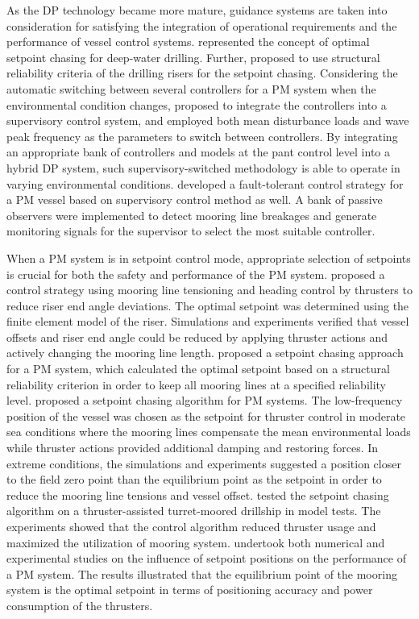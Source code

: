 \begin{sloppypar}
As the DP technology became more mature, guidance systems are taken into consideration for satisfying the integration of operational requirements and the performance of vessel control systems.  \cite{sorensen2001optimal} represented the concept of optimal setpoint chasing for deep-water drilling. Further,  \cite{leira2006structural} proposed to use structural reliability criteria of the drilling risers for the setpoint chasing. Considering the automatic switching between several controllers for a PM system when the environmental condition changes, \cite{nguyen2009switching} proposed to integrate the controllers into a supervisory control system, and employed both mean disturbance loads and wave peak frequency as the parameters to switch between controllers. By integrating an appropriate bank of controllers and models at the pant control level into a hybrid DP system, such supervisory-switched methodology is able to operate in varying environmental conditions. \cite{ren2015supervisory} developed a fault-tolerant control strategy for a PM vessel based on supervisory control method as well. A bank of passive observers were implemented to detect mooring line breakages and generate monitoring signals for the supervisor to select the most suitable controller.

When a PM system is in setpoint control mode, appropriate selection of setpoints is crucial for both the safety and performance of the PM system. \cite{nguyen2010control} proposed a control strategy using mooring line tensioning and heading control by thrusters to reduce riser end angle deviations. The optimal setpoint was determined using the finite element model of the riser. Simulations and experiments verified that vessel offsets and riser end angle could be reduced by applying thruster actions and actively changing the mooring line length. \cite{fang2013position} proposed a setpoint chasing approach for a PM system, which calculated the optimal setpoint based on a structural reliability criterion in order to keep all mooring lines at a specified reliability level. \cite{nguyen2009setpoint} proposed a setpoint chasing algorithm for PM systems. The low-frequency position of the vessel was chosen as the setpoint for thruster control in moderate sea conditions where the mooring lines compensate the mean environmental loads while thruster actions provided additional damping and restoring forces. In extreme conditions, the simulations and experiments suggested a position closer to the field zero point than the equilibrium point as the setpoint in order to reduce the mooring line tensions and vessel offset. \cite{bjorno2017modeling} tested the setpoint chasing algorithm on a thruster-assisted turret-moored drillship in model tests. The experiments showed that the control algorithm reduced thruster usage and maximized the utilization of mooring system. \cite{wang2016numerical} undertook both numerical and experimental studies on the influence of setpoint positions on the performance of a PM system. The results illustrated that the equilibrium point of the mooring system is the optimal setpoint in terms of positioning accuracy and power consumption of the thrusters. 


\end{sloppypar}
